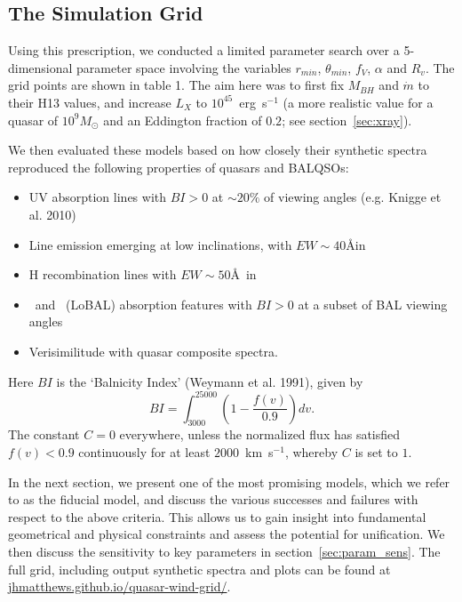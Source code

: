 \documentclass[useAMS,usenatbib]{mn2e_x}
\begin{document}
\subsection{The Simulation Grid}

Using this prescription, we conducted a limited parameter
search over a 5-dimensional parameter space involving the 
variables $r_{min}$, $\theta_{min}$, $f_V$, $\alpha$ and $R_v$.
The grid points are shown in table 1.
The aim here was to first fix $M_{BH}$ and $\dot{m}$ to their H13 values,
and increase $L_X$ to $10^{45}$~erg~s$^{-1}$ (a more realistic value for a 
quasar of $10^9M_\odot$ and an Eddington fraction of $0.2$; see section~\ref{sec:xray}).

We then evaluated these models based on 
how closely their synthetic spectra reproduced the 
following properties of quasars and BALQSOs:

\begin{itemize}
\item UV absorption lines 
with $BI > 0$ at $\sim20\%$ of viewing angles (e.g. Knigge et al. 2010)
\item Line emission emerging at low inclinations, with $EW\sim40$\AA in \civline\ \citep[e.g. ][]{shen2011}
\item H recombination lines with $EW\sim50$\AA\ in \la\ \citep[e.g. ][]{shen2011}
\item  \mg\ and \al\ (LoBAL) absorption features with $BI > 0$ at a subset of 
BAL viewing angles
\item Verisimilitude with quasar composite spectra.
\end{itemize}
Here $BI$ is the `Balnicity Index' (Weymann et al. 1991), given by
\begin{equation}
BI = \int^{25000}_{3000} \left( 1 - \frac{f(v)}{0.9} \right) dv.
\end{equation}
The constant $C=0$ everywhere, unless the normalized flux
has satisfied $f(v)<0.9$ continuously for at least $2000$~km~s$^{−1}$, 
whereby $C$ is set to $1$.

In the next section, we present one of the most promising models,
which we refer to as the fiducial model, and discuss
the various successes and failures with respect to the above criteria.
This allows us to gain insight into fundamental geometrical 
and physical constraints and assess the potential for unification. 
We then discuss the sensitivity to key parameters in section~\ref{sec:param_sens}.
The full grid, including output synthetic spectra and plots can be found at
\url{jhmatthews.github.io/quasar-wind-grid/}.
\end{document}
